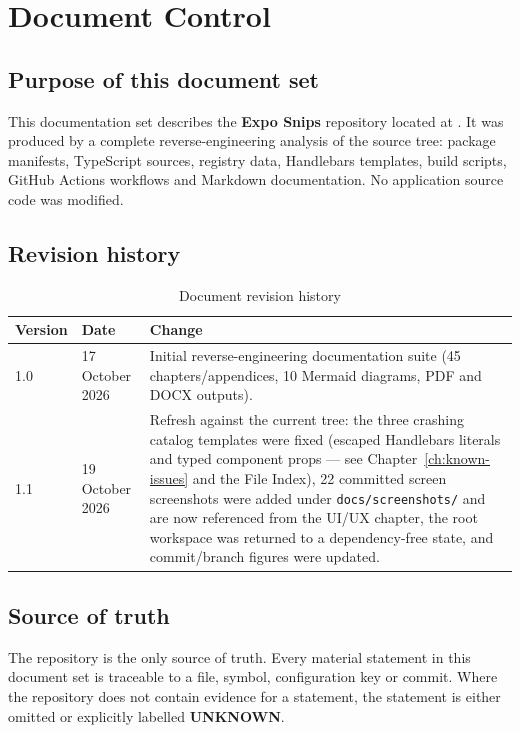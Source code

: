 \chapter*{Document Control}

\section*{Purpose of this document set}

This documentation set describes the \textbf{Expo Snips} repository located at
\RepositoryPath. It was produced by a complete reverse-engineering analysis of
the source tree: package manifests, TypeScript sources, registry data, Handlebars
templates, build scripts, GitHub Actions workflows and Markdown documentation.
No application source code was modified.

\section*{Revision history}

\begin{table}[H]
\centering
\caption{Document revision history}
\begin{tabular}{p{2cm}p{3cm}p{9.4cm}}
\toprule
\textbf{Version} & \textbf{Date} & \textbf{Change} \\
\midrule
1.0 & 17 October 2026 & Initial reverse-engineering documentation suite
(45 chapters/appendices, 10 Mermaid diagrams, PDF and DOCX outputs). \\
1.1 & 19 October 2026 & Refresh against the current tree: the three crashing
catalog templates were fixed (escaped Handlebars literals and typed component
props --- see Chapter~\ref{ch:known-issues} and the File Index), 22 committed
screen screenshots were added under \texttt{docs/screenshots/} and are now
referenced from the UI/UX chapter, the root workspace was returned to a
dependency-free state, and commit/branch figures were updated. \\
\bottomrule
\end{tabular}
\end{table}

\section*{Source of truth}

The repository is the only source of truth. Every material statement in this
document set is traceable to a file, symbol, configuration key or commit. Where
the repository does not contain evidence for a statement, the statement is either
omitted or explicitly labelled \textbf{UNKNOWN}.

